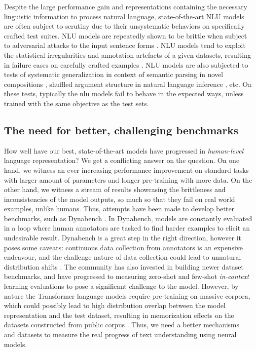 \documentclass[letterpaper, 12pt]{report}
\begin{document}
Despite the large performance gain and representations containing the necessary linguistic information to process natural language, state-of-the-art NLU models are often subject to scrutiny due to their unsystematic behaviors on specifically crafted test suites. NLU models are repeatedly shown to be brittle when subject to adversarial attacks \cite{jia-liang-2017-adversarial,ettinger-etal-2017-towards, ettinger-2020-bert} to the input sentence forms \cite{kaushik2018much}. NLU models tend to exploit the statistical irregularities and annotation artefacts \cite{gururangan2018a,poliak-etal-2018-hypothesis,tsuchiya-2018-performance} of a given datasets, resulting in failure cases on carefully crafted examples \cite{naik-etal-2018-stress,mccoy2019}.
NLU models are also subjected to tests of systematic generalization in context of semantic parsing in novel compositions \cite{lake2017generalization}, shuffled argument structure in natural language inference \cite{dasgupta-etal-2018-evaluating}, etc. On these tests, typically the \acrshort{nlu} models fail to behave in the expected ways, unless trained with the same objective as the test sets.

\subsection{The need for better, challenging benchmarks}

How well have our best, state-of-the-art models have progressed in \textit{human-level} language representation? We get a conflicting answer on the question. On one hand, we witness an ever increasing performance improvement on standard tasks with larger amount of parameters and longer pre-training with more data. On the other hand, we witness a stream of results showcasing the brittleness and inconsistencies of the model outputs, so much so that they fail on real world examples, unlike humans. Thus, attempts have been made to develop better benchmarks, such as Dynabench \citep{kiela-etal-2021-dynabench}. In Dynabench, models are constantly evaluated in a loop where human annotators are tasked to find harder examples to elicit an undesirable result. Dynabench is a great step in the right direction, however it poses some caveats: continuous data collection from annotators is an expensive endeavour, and the challenge nature of data collection could lead to unnatural distribution shifts \citep[Section~4, pp. 7]{kiela-etal-2021-dynabench}. The community has also invested in building newer dataset benchmarks, and have progressed to measuring zero-shot and few-shot \textit{in-context} learning evaluations to pose a significant challenge to the model. However, by nature the Transformer language models require pre-training on massive corpora, which could possibly lead to high distribution overlap between the model representation and the test dataset, resulting in memorization effects on the datasets constructed from public corpus \citep{carlini2021, carlini2022a}. Thus, we need a better mechanisms and datasets to measure the real progress of text understanding using neural models.
\end{document}
